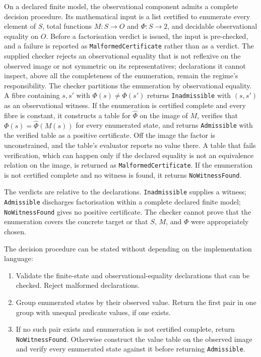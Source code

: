 \documentclass[11pt]{article}
\theoremstyle{definition}
\newcommand{\code}[1]{\texttt{#1}}
\begin{document}
On a declared finite model, the observational component admits a complete decision procedure. Its mathematical input is a list certified to enumerate every element of $S$, total functions $M:S\to O$ and $\Phi:S\to 2$, and decidable observational equality on $O$. Before a factorisation verdict is issued, the input is pre-checked, and a failure is reported as \code{MalformedCertificate} rather than as a verdict. The supplied checker rejects an observational equality that is not reflexive on the observed image or not symmetric on its representatives; declarations it cannot inspect, above all the completeness of the enumeration, remain the regime's responsibility. The checker partitions the enumeration by observational equality. A fibre containing $s,s'$ with $\Phi(s)\neq\Phi(s')$ returns \code{Inadmissible} with $(s,s')$ as an observational witness. If the enumeration is certified complete and every fibre is constant, it constructs a table for $\widehat\Phi$ on the image of $M$, verifies that $\Phi(s)=\widehat\Phi(M(s))$ for every enumerated state, and returns \code{Admissible} with the verified table as a positive certificate. Off the image the factor is unconstrained, and the table's evaluator reports no value there. A table that fails verification, which can happen only if the declared equality is not an equivalence relation on the image, is returned as \code{MalformedCertificate}. If the enumeration is not certified complete and no witness is found, it returns \code{NoWitnessFound}.

The verdicts are relative to the declarations. \code{Inadmissible} supplies a witness; \code{Admissible} discharges factorisation within a complete declared finite model; \code{NoWitnessFound} gives no positive certificate. The checker cannot prove that the enumeration covers the concrete target or that $S$, $M$, and $\Phi$ were appropriately chosen.

The decision procedure can be stated without depending on the implementation language:
\begin{enumerate}
\item Validate the finite-state and observational-equality declarations that can be checked. Reject malformed declarations.
\item Group enumerated states by their observed value. Return the first pair in one group with unequal predicate values, if one exists.
\item If no such pair exists and enumeration is not certified complete, return \code{NoWitnessFound}. Otherwise construct the value table on the observed image and verify every enumerated state against it before returning \code{Admissible}.
\end{enumerate}
\end{document}
